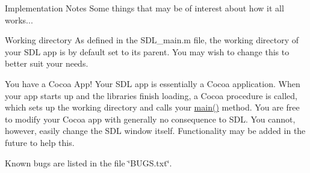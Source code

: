 \begin{DoxyItemize}
\item Implementation Notes Some things that may be of interest about how it all works...
\begin{DoxyItemize}
\item Working directory As defined in the S\+D\+L\+\_\+main.\+m file, the working directory of your S\+DL app is by default set to its parent. You may wish to change this to better suit your needs.
\item You have a Cocoa App! Your S\+DL app is essentially a Cocoa application. When your app starts up and the libraries finish loading, a Cocoa procedure is called, which sets up the working directory and calls your \mbox{\hyperlink{_c_make_c_compiler_id_8c_a0ddf1224851353fc92bfbff6f499fa97}{main()}} method. You are free to modify your Cocoa app with generally no consequence to S\+DL. You cannot, however, easily change the S\+DL window itself. Functionality may be added in the future to help this.
\end{DoxyItemize}
\end{DoxyItemize}

Known bugs are listed in the file \char`\"{}\+B\+U\+G\+S.\+txt\char`\"{}. 